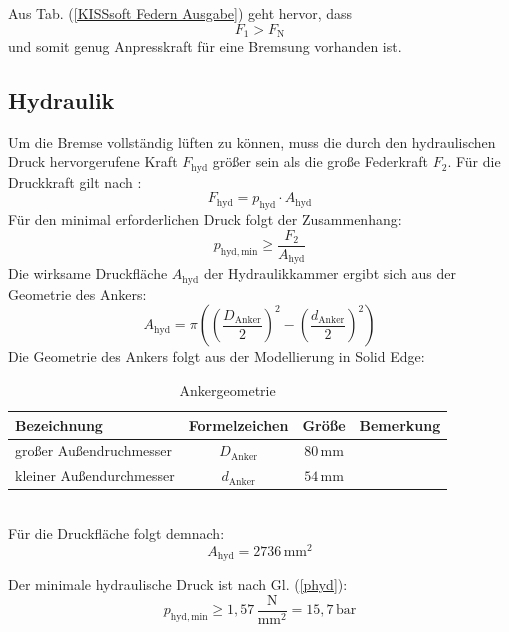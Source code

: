 \noindent
Aus Tab. (\ref{KISSsoft Federn Ausgabe}) geht hervor, dass 
\begin{equation*}
    F_1 > F_\mathrm{N}
\end{equation*}
und somit genug Anpresskraft für eine Bremsung vorhanden ist.

\subsection{Hydraulik}
Um die Bremse vollständig lüften zu können, muss die durch den hydraulischen Druck hervorgerufene Kraft $F_\mathrm{hyd}$ größer sein als die große Federkraft $F_2$. 
Für die Druckkraft gilt nach \cite[S. 46, Gl. 3.10]{RM}:
\begin{equation} \label{Fhyd}
    F_\mathrm{hyd} = p_\mathrm{hyd} \cdot A_\mathrm{hyd}
\end{equation}
Für den minimal erforderlichen Druck folgt der Zusammenhang: 
\begin{equation} \label{phyd}
    p_\mathrm{hyd,min} \geq \frac{F_2}{A_\mathrm{hyd}}
\end{equation}
Die wirksame Druckfläche $A_\mathrm{hyd}$ der Hydraulikkammer ergibt sich aus der Geometrie des Ankers:
\begin{equation}
    A_\mathrm{hyd} = \pi \left( \left(\frac{D_\mathrm{Anker}}{2} \right)^2 - \left(\frac{d_\mathrm{Anker}}{2}\right)^2 \right)
\end{equation}
Die Geometrie des Ankers folgt aus der Modellierung in Solid Edge:
\begin{table}[H]
    \centering
    \caption{Ankergeometrie}
    \begin{tabular}{p{8cm}ccc}
        \toprule
        Bezeichnung&  Formelzeichen& Größe& Bemerkung\\
        \midrule
         großer Außendruchmesser& $D_\mathrm{Anker}$& $80\,\mathrm{mm}$& \\
         kleiner Außendurchmesser& $d_\mathrm{Anker}$& $54\,\mathrm{mm}$& \\
        \bottomrule
    \end{tabular}
    \label{Ankergeometrie}
\end{table}\\

\noindent
Für die Druckfläche folgt demnach: 
\begin{equation}
    A_\mathrm{hyd} = 2736\,\mathrm{mm^2}
\end{equation}

\noindent
Der minimale hydraulische Druck ist nach Gl. (\ref{phyd}):
\begin{equation}
    p_\mathrm{hyd,min} \geq 1,57\,\mathrm{\frac{N}{mm^2}} = 15,7\,\mathrm{bar}
\end{equation}

